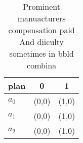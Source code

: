\documentclass[a4paper]{article}
\begin{document}
\begin{table}
\begin{adjustbox}{width=0.7\columnwidth}
\begin{tabular}{|l|l|l|}
\hline
\textbf{plan} & \multicolumn{1}{c|}{\textbf{0}} & \multicolumn{1}{c|}{\textbf{1}} \\ \hline
\textbf{$a_0$}  & (0,0) & (1,0) \\ \hline
\textbf{$a_1$}  & (0,0) & (1,0) \\ \hline
\textbf{$a_2$}  & (0,0) & (1,0) \\ \hline
\end{tabular}
\end{adjustbox}
\caption{Prominent manuacturers compensation paid And diiculty sometimes in bbld combina
}
\end{table}
\end{document}
